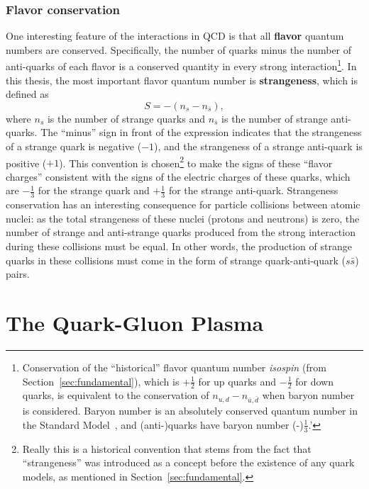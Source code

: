 \subsubsection{Flavor conservation}
\label{sec:flavor_conservation}

One interesting feature of the interactions in QCD is that all \textbf{flavor} quantum numbers are conserved. Specifically, the number of quarks minus the number of anti-quarks of each flavor is a conserved quantity in every strong interaction\footnote{Conservation of the ``historical'' flavor quantum number \textit{isospin} (from Section~\ref{sec:fundamental}), which is $+\frac{1}{2}$ for up quarks and $-\frac{1}{2}$ for down quarks, is equivalent to the conservation of $n_{u,d} - n_{\bar{u}, \bar{d}}$ when baryon number is considered. Baryon number is an absolutely conserved quantum number in the Standard Model~\cite{PDG}, and (anti-)quarks have baryon number (-)$\frac{1}{3}$.'}. In this thesis, the most important flavor quantum number is \textbf{strangeness}, which is defined as
%
\begin{equation}
    \label{eq:strangeness}
    S = - (n_s - n_{\bar{s}}),
\end{equation}
where $n_s$ is the number of strange quarks and $n_{\bar{s}}$ is the number of strange anti-quarks. The ``minus'' sign in front of the expression indicates that the strangeness of a strange quark is negative ($-1$), and the strangeness of a strange anti-quark is positive ($+1$). This convention is chosen\footnote{Really this is a historical convention that stems from the fact that ``strangeness'' was introduced as a concept before the existence of any quark models, as mentioned in Section~\ref{sec:fundamental}.} to make the signs of these ``flavor charges'' consistent with the signs of the electric charges of these quarks, which are $-\frac{1}{3}$ for the strange quark and $+\frac{1}{3}$ for the strange anti-quark. Strangeness conservation has an interesting consequence for particle collisions between atomic nuclei: as the total strangeness of these nuclei (protons and neutrons) is zero, the number of strange and anti-strange quarks produced from the strong interaction during these collisions must be equal. In other words, the production of strange quarks in these collisions must come in the form of strange quark-anti-quark ($s\bar{s}$) pairs.



\section{The Quark-Gluon Plasma}
\label{sec:qgp_theory}

